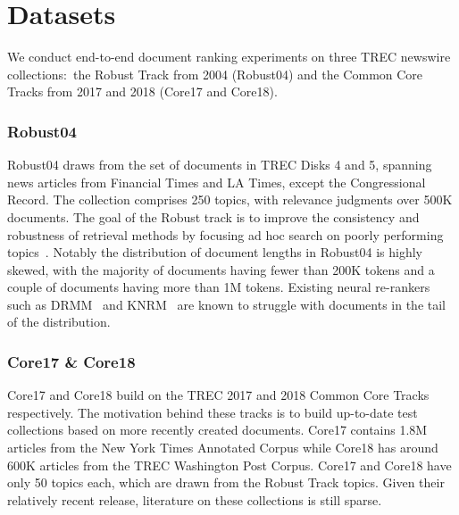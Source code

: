 \section{Datasets}

We conduct end-to-end document ranking experiments on three TREC newswire collections:\ the Robust Track from 2004 (Robust04) and the Common Core Tracks from 2017 and 2018 (Core17 and Core18).

\subsubsection{Robust04}

Robust04 draws from the set of documents in TREC Disks 4 and 5, spanning news articles from Financial Times and LA Times, except the Congressional Record.
The collection comprises 250 topics, with relevance judgments over 500K documents.
The goal of the Robust track is to improve the consistency and robustness of retrieval methods by focusing ad hoc search on poorly performing topics~\cite{Voorhees_TREC2004_robust}.
Notably the distribution of document lengths in Robust04 is highly skewed, with the majority of documents having fewer than 200K tokens and a couple of documents having more than 1M tokens.
Existing neural re-rankers such as DRMM~\cite{guo2016deep} and KNRM~\cite{xiong2017knrm} are known to struggle with documents in the tail of the distribution.

\subsubsection{Core17 \& Core18}

Core17 and Core18 build on the TREC 2017 and 2018 Common Core Tracks respectively.
The motivation behind these tracks is to build up-to-date test collections based on more recently created documents.
Core17 contains 1.8M articles from the New York Times Annotated Corpus while Core18 has around 600K articles from the TREC Washington Post Corpus.
Core17 and Core18 have only 50 topics each, which are drawn from the Robust Track topics.
Given their relatively recent release, literature on these collections is still sparse.


